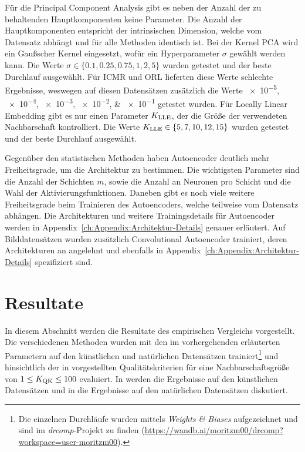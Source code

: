 Für die Principal Component Analysis gibt es neben der Anzahl der zu behaltenden Hauptkomponenten
keine Parameter. Die Anzahl der Hauptkomponenten entspricht der intrinsischen Dimension, welche vom
Datensatz abhängt und für alle Methoden identisch ist. Bei der Kernel PCA wird ein Gaußscher Kernel
eingesetzt, wofür ein Hyperparameter $\sigma$ gewählt werden kann. Die Werte $\sigma \in \{ 0.1,
	0.25, 0.75, 1, 2, 5\}$ wurden getestet und der beste Durchlauf ausgewählt. Für ICMR und ORL
lieferten diese Werte schlechte Ergebnisse, weswegen auf diesen Datensätzen zusätzlich die Werte
\numlist{e-5;e-4;e-3;e-2;e-1} getestet wurden. Für Locally Linear Embedding gibt es nur einen
Parameter $K_{\text{LLE}}$, der die Größe der verwendeten Nachbarschaft kontrolliert. Die Werte $K_{\text{LLE}} \in
	\{ 5, 7, 10, 12, 15\}$ wurden getestet und der beste Durchlauf ausgewählt.

Gegenüber den statistischen Methoden haben Autoencoder deutlich mehr Freiheitsgrade, um die
Architektur zu bestimmen. Die wichtigsten Parameter sind die Anzahl der Schichten $m$, sowie die
Anzahl an Neuronen pro Schicht und die Wahl der Aktivierungsfunktionen. Daneben gibt es noch viele
weitere Freiheitsgrade beim Trainieren des Autoencoders, welche teilweise vom Datensatz abhängen.
Die Architekturen und weitere Trainingsdetails für Autoencoder werden in
Appendix~\ref{ch:Appendix:Architektur-Details} genauer erläutert. Auf Bilddatensätzen wurden
zusätzlich Convolutional Autoencoder trainiert, deren Architekturen an \textcite[14]{Ghosh.2019}
angelehnt und ebenfalls in Appendix~\ref{ch:Appendix:Architektur-Details} spezifiziert sind.

\section{Resultate}
\label{ch:Vergleich:sec:Resultate}

In diesem Abschnitt werden die Resultate des empirischen Vergleichs vorgestellt. Die verschiedenen
Methoden wurden mit den im vorhergehenden 
erläuterten Parametern auf den künstlichen und natürlichen Datensätzen trainiert\footnote{Die
	einzelnen Durchläufe wurden mittels \textit{Weights \& Biases} aufgezeichnet und sind im
	\textit{drcomp}-Projekt zu finden
	(\url{https://wandb.ai/moritzm00/drcomp?workspace=user-moritzm00}).} und hinsichtlich der in
 vorgestellten Qualitätskriterien für
eine Nachbarschaftsgröße von $1 \leq K_{\text{QK}} \leq 100$ evaluiert. In
 werden die Ergebnisse auf den künstlichen
Datensätzen und in  die Ergebnisse auf den
natürlichen Datensätzen diskutiert.

